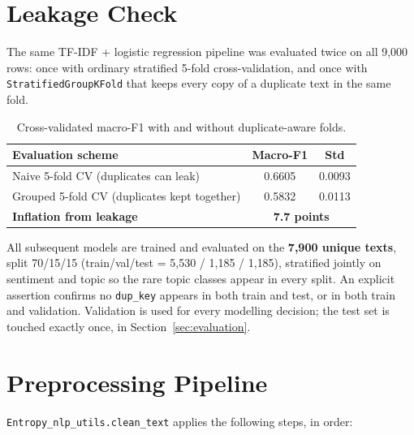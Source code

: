 \documentclass[11pt,a4paper]{article}
\begin{document}
\section{Leakage Check}
\label{sec:leakage}

The same TF-IDF + logistic regression pipeline was evaluated twice on all 9{,}000 rows: once with ordinary stratified 5-fold cross-validation, and once with \texttt{StratifiedGroupKFold} that keeps every copy of a duplicate text in the same fold.

\begin{table}[H]
\centering
\begin{tabular}{@{}lcc@{}}
\toprule
\textbf{Evaluation scheme} & \textbf{Macro-F1} & \textbf{Std} \\
\midrule
Naive 5-fold CV (duplicates can leak) & 0.6605 & 0.0093 \\
Grouped 5-fold CV (duplicates kept together) & 0.5832 & 0.0113 \\
\midrule
\textbf{Inflation from leakage} & \multicolumn{2}{c}{\textbf{7.7 points}} \\
\bottomrule
\end{tabular}
\caption{Cross-validated macro-F1 with and without duplicate-aware folds.}
\end{table}

All subsequent models are trained and evaluated on the \textbf{7{,}900 unique texts}, split 70/15/15 (train/val/test = 5{,}530 / 1{,}185 / 1{,}185), stratified jointly on sentiment and topic so the rare topic classes appear in every split. An explicit assertion confirms no \texttt{dup\_key} appears in both train and test, or in both train and validation. Validation is used for every modelling decision; the test set is touched exactly once, in Section~\ref{sec:evaluation}.

\section{Preprocessing Pipeline}

\texttt{Entropy\_nlp\_utils.clean\_text} applies the following steps, in order:
\end{document}
